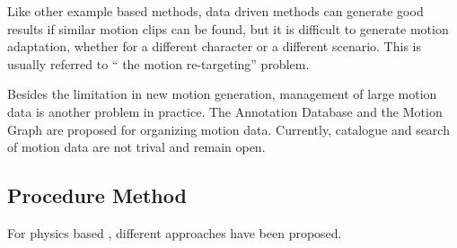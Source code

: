 Like other example based methods, data driven methods can generate good results if similar motion clips can be found, but it is difficult to generate  motion adaptation, whether for a different character or a different scenario. 
This is usually referred to `` the motion re-targeting'' problem.

Besides the limitation in new motion generation, management of large motion data is another problem in practice. 
The Annotation Database \citep{Arikan2003} and the Motion Graph \citep{kovar2008motion}are proposed for organizing motion data. 
Currently, catalogue and search of motion data are not trival and remain open\citep{keogh2004indexing,muller2005efficient}.

\subsection{Procedure Method}
For physics based \cms, different approaches have been proposed.

